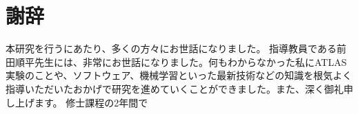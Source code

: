 \chapter*{謝辞}

本研究を行うにあたり、多くの方々にお世話になりました。
指導教員である前田順平先生には、非常にお世話になりました。何もわからなかった私にATLAS実験のことや、ソフトウェア、機械学習といった最新技術などの知識を根気よく指導いただいたおかげで研究を進めていくことができました。また、深く御礼申し上げます。
修士課程の2年間で



